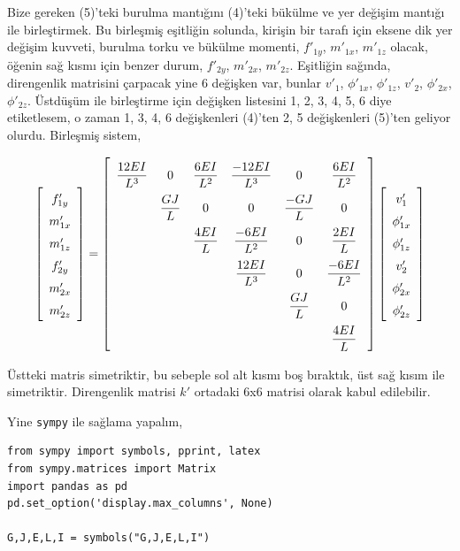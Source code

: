 \documentclass[12pt,fleqn]{article}\usepackage{../../common}
\begin{document}
Bize gereken (5)'teki burulma mantığını (4)'teki bükülme ve yer değişim mantığı
ile birleştirmek. Bu birleşmiş eşitliğin solunda, kirişin bir tarafı için eksene
dik yer değişim kuvveti, burulma torku ve bükülme momenti, $f'_{1y}$, $m'_{1x}$,
$m'_{1z}$ olacak, öğenin sağ kısmı için benzer durum, $f'_{2y}$, $m'_{2x}$,
$m'_{2z}$.  Eşitliğin sağında, direngenlik matrisini çarpacak yine 6 değişken
var, bunlar $v'_1$, $\phi'_{1x}$, $\phi'_{1z}$, $v'_2$, $\phi'_{2x}$,
$\phi'_{2z}$. Üstdüşüm ile birleştirme için değişken listesini 1, 2, 3, 4, 5, 6
diye etiketlesem, o zaman 1, 3, 4, 6 değişkenleri (4)'ten 2, 5 değişkenleri
(5)'ten geliyor olurdu. Birleşmiş sistem,

$$
\renewcommand*{\arraystretch}{1.5}
\left[\begin{array}{c}
f'_{1y} \\ m'_{1x} \\ m'_{1z} \\ f'_{2y} \\ m'_{2x} \\ m'_{2z} 
\end{array}\right] =
\renewcommand*{\arraystretch}{2.2}
\left[\begin{array}{cccccc}
\dfrac{12 EI}{L^3} & 0 & \dfrac{6 EI}{L^2} & \dfrac{-12EI}{L^3} & 0 & \dfrac{6EI}{L^2}\\
 & \dfrac{GJ}{L} & 0 & 0 & \dfrac{-GJ}{L} & 0 \\
 & & \dfrac{4EI}{L} & \dfrac{-6EI}{L^2} & 0 & \dfrac{2EI}{L} \\
 & & & \dfrac{12EI}{L^3} & 0 & \dfrac{-6EI}{L^2} \\
 & & & & \dfrac{GJ}{L} & 0 \\
 & & & & & \dfrac{4EI}{L} 
\end{array}\right]
\renewcommand*{\arraystretch}{1.5}
\left[\begin{array}{c}
v'_1 \\ \phi'_{1x} \\ \phi'_{1z} \\ v'_2 \\ \phi'_{2x} \\ \phi'_{2z}
\end{array}\right]
$$

Üstteki matris simetriktir, bu sebeple sol alt kısmı boş bıraktık, üst sağ kısım
ile simetriktir. Direngenlik matrisi $k'$ ortadaki 6x6 matrisi olarak kabul
edilebilir.

Yine \verb!sympy! ile sağlama yapalım,

\begin{verbatim}
from sympy import symbols, pprint, latex
from sympy.matrices import Matrix
import pandas as pd
pd.set_option('display.max_columns', None)

G,J,E,L,I = symbols("G,J,E,L,I")
\end{verbatim}
\end{document}
